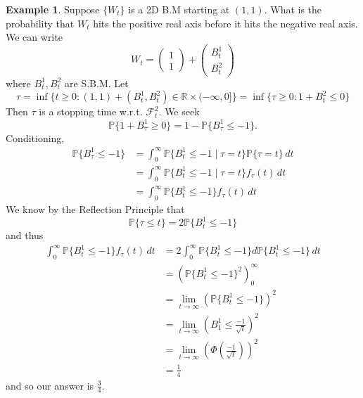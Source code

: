 \documentclass[10pt, oneside]{article}
\newcommand{\bbR}{\mathbb{R}}
\newcommand{\bbP}{\mathbb{P}}
\theoremstyle{definition}
\newtheorem{exmp}{Example}[section]
\begin{document}
\begin{exmp}
Suppose $\{W_t\}$ is a 2D B.M starting at $(1,1).$ What is the probability that $W_t$ hits the positive real axis before it hits the negative real axis. We can write 
\[W_t = \begin{pmatrix} 1\\1\end{pmatrix} + \begin{pmatrix}B_t^1 \\B_t^2\end{pmatrix}\] where $B_t^1, B_t^2$ are S.B.M. Let
\[\tau = \inf\{t \geq 0 : (1,1) + (B_t^1, B_t^2) \in \bbR \times (-\infty, 0]\} = \inf\{\tau \geq 0 : 1+ B_t^2 \leq 0\}\]
Then $\tau$ is a stopping time w.r.t. $\mathcal{F}_t^2.$ We seek 
\[\bbP\{1 + B_\tau^1 \geq 0\} = 1-\bbP\{B_\tau^1 \leq -1\}.\] Conditioning, 
\begin{align*}
\bbP\{B_\tau^1 \leq -1\} &= \int_0^\infty \bbP\{B^1_t \leq -1 \mid \tau = t\}\bbP\{\tau = t\}\,dt\\
&= \int_0^\infty \bbP\{B_t^1 \leq -1 \mid \tau = t\}f_\tau(t)\,dt\\
&= \int_0^\infty \bbP\{B_t^1 \leq -1\}f_\tau(t)\,dt
\end{align*}
We know by the Reflection Principle that
\[\bbP\{\tau \leq t\} = 2\bbP\{B_t^1 \leq -1\}\] and thus
\begin{align*}
\int_0^\infty \bbP\{B_t^1 \leq -1\}f_\tau(t)\,dt &= 2\int_0^\infty \bbP\{B_t^1 \leq -1\}d\bbP\{B_t^{1} \leq -1\}\,dt\\
&= (\bbP\{B^1_t \leq -1\}^2)_0^\infty\\
&= \lim_{t\to \infty}\left(\bbP\{B^1_t \leq -1\}\right)^2\\
&= \lim_{t\to \infty} \left(B_1^1 \leq \frac{-1}{\sqrt{t}}\right)^2\\
&= \lim_{t\to \infty} (\Phi(\frac{-1}{\sqrt{t}}))^2\\
&= \frac{1}{4}
\end{align*}
and so our answer is $\frac{3}{4}.$
\end{exmp}

\newpage
\end{document}
